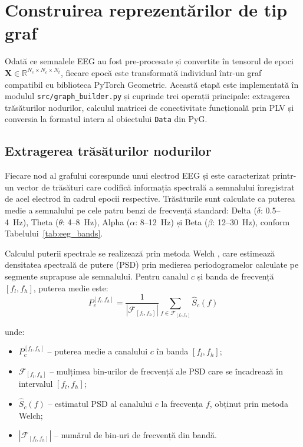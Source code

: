\documentclass[12pt,a4paper]{report}
\theoremstyle{definition}
\theoremstyle{remark}
\begin{document}
\section{Construirea reprezentărilor de tip graf}
\label{sec:impl_graf}

Odată ce semnalele EEG au fost pre-procesate și convertite în tensorul de epoci $\mathbf{X} \in \mathbb{R}^{N_e \times N_c \times N_t}$, fiecare epocă este transformată individual într-un graf compatibil cu biblioteca PyTorch Geometric. Această etapă este implementată în modulul \texttt{src/graph\_builder.py} și cuprinde trei operații principale: extragerea trăsăturilor nodurilor, calculul matricei de conectivitate funcțională prin PLV și conversia la formatul intern al obiectului \texttt{Data} din PyG.

\subsection{Extragerea trăsăturilor nodurilor}

Fiecare nod al grafului corespunde unui electrod EEG și este caracterizat printr-un vector de trăsături care codifică informația spectrală a semnalului înregistrat de acel electrod în cadrul epocii respective. Trăsăturile sunt calculate ca puterea medie a semnalului pe cele patru benzi de frecvență standard: Delta ($\delta$: 0.5--4~Hz), Theta ($\theta$: 4--8~Hz), Alpha ($\alpha$: 8--12~Hz) și Beta ($\beta$: 12--30~Hz), conform Tabelului~\ref{tab:eeg_bands}.

Calculul puterii spectrale se realizează prin metoda Welch \cite{awais2024graphical}, care estimează densitatea spectrală de putere (PSD) prin medierea periodogramelor calculate pe segmente suprapuse ale semnalului. Pentru canalul $c$ și banda de frecvență $[f_l, f_h]$, puterea medie este:
\begin{equation}
    P_c^{[f_l, f_h]} = \frac{1}{|\mathcal{F}_{[f_l,f_h]}|} \sum_{f \in \mathcal{F}_{[f_l,f_h]}} \widehat{S}_c(f)
    \label{eq:band_power}
\end{equation}

\noindent unde:
\begin{itemize}
    \item $P_c^{[f_l, f_h]}$ -- puterea medie a canalului $c$ în banda $[f_l, f_h]$;
    \item $\mathcal{F}_{[f_l,f_h]}$ -- mulțimea bin-urilor de frecvență ale PSD care se încadrează în intervalul $[f_l, f_h]$;
    \item $\widehat{S}_c(f)$ -- estimatul PSD al canalului $c$ la frecvența $f$, obținut prin metoda Welch;
    \item $|\mathcal{F}_{[f_l,f_h]}|$ -- numărul de bin-uri de frecvență din bandă.
\end{itemize}
\end{document}
